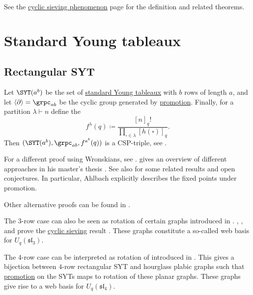 
See the \hyperref[cyclicSieving]{cyclic sieving phenomenon}
page for the definition and related theorems.


\section[cspTableau]{Standard Young tableaux}


\subsection[cspRectangularSYT]{Rectangular SYT}


Let $\SYT(a^b)$ be the set of
\hyperref[standardYoungTableau]{standard Young tableaux} with $b$ rows of length $a$,
and let $\langle \partial \rangle = \grpc_{ab}$ be the cyclic group generated by \hyperref[promotion]{promotion}.
Finally, for a partition $\lambda \vdash n$ define the
\label{qHookFormulaCSPTableau}
\[
f^{\lambda}(q) \coloneqq \frac{[n]_q!}{\prod_{\square \in \lambda} [h(\square)]_q}.
\]
Then
$
(\SYT(a^b), \grpc_{ab}, f^{a^b}(q))
$
is a CSP-triple, see  \cite{Rhoades2010}.

For a different proof using Wronskians, see \cite{Purbhoo2013}.
 gives an overview of different approaches in his master's
thesis \cite{Rhee2019}.
See also  \cite{Ahlbach2019} for some related results
and open conjectures.
In particular, Ahlbach explicitly describes the fixed points under promotion.

Other alternative proofs can be found in
\cite{FontaineKamnitzer2013,Westbury2016,Westbury2019}.

The $3$-row case can also be seen as rotation of certain graphs introduced in
\cite{Kuperberg1996}.
, , and 
prove the \hyperref[cyclicSieving]{cyclic sieving} result
\cite{PetersenPylyavskyyRhoades2008}.
These graphs constitute a so-called web basis for $U_q(\mathfrak{sl}_3)$.

The $4$-row case can be interpreted as rotation of
\label{hourglassPlabicGraph} introduced in
\cite{GaetzPechenikPfannererStrikerSwanson2023x}.  This gives a bijection
between $4$-row rectangular SYT and hourglass plabic graphs such that
\hyperref[promotion]{promotion} on the SYTs maps to rotation of these planar
graphs.
These graphs give rise to a web basis for $U_q(\mathfrak{sl}_4)$.

